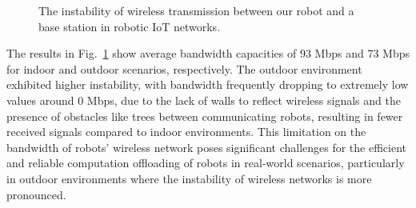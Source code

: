 \begin{figure}[htp]
    \centering
    \hfil
    \caption{The instability of wireless transmission between our robot and a base station in robotic IoT networks.}
    \label{fig:bandwidth} 
\end{figure}


The results in Fig.~\ref{fig:bandwidth} show average bandwidth capacities of 93 Mbps and 73 Mbps for indoor and outdoor scenarios, respectively. 
The outdoor environment exhibited higher instability, with bandwidth frequently dropping to extremely low values around 0 Mbps, due to the lack of walls to reflect wireless signals and the presence of obstacles like trees between communicating robots, resulting in fewer received signals compared to indoor environments. This limitation on the bandwidth of robots' wireless network poses significant challenges for the efficient and reliable computation offloading of robots in real-world scenarios, particularly in outdoor environments where the instability of wireless networks is more pronounced.

